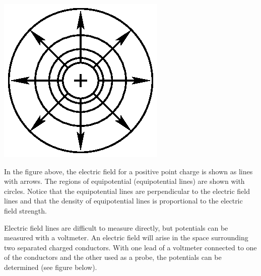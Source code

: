 \vspace{0.3cm}
{\centering \includegraphics{electric_fields_and_equipotential_lines/ef_equipot_lines_fig_2.eps} \par}
\vspace{0.3cm}

In the figure above, the electric field for a positive point charge
is shown as lines with arrows. The regions of equipotential (equipotential
lines) are shown with circles. Notice that the equipotential lines
are perpendicular to the electric field lines and that the density
of equipotential lines is proportional to the electric field strength.

Electric field lines are difficult to measure directly, but potentials
can be measured with a voltmeter. An electric field will arise in
the space surrounding two separated charged conductors. With one lead
of a voltmeter connected to one of the conductors and the other used
as a probe, the potentials can be determined (see figure below).

\vspace{0.3cm}
{\centering {} \par}
\vspace{0.3cm}

